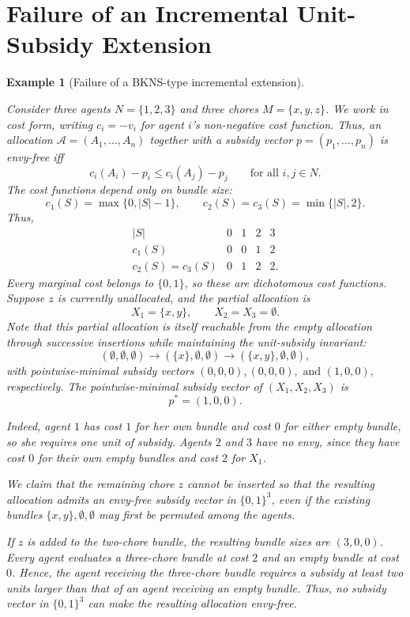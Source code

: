 \documentclass[11pt]{article}
\theoremstyle{plain}
\newtheorem{example}{Example}
\theoremstyle{plain}
\begin{document}
\section{Failure of an Incremental Unit-Subsidy Extension}
\label{sec:whynotbkns}


\begin{example}[Failure of a BKNS-type incremental extension]
\label{app:extension-failure}

Consider three agents $N=\{1,2,3\}$ and three chores $M=\{x,y,z\}$. We work in cost form, writing
\( c_i=-v_i \)
for agent \(i\)'s non-negative cost function. Thus, an allocation \(\mathcal A=(A_1,\ldots,A_n)\) together with a subsidy vector \(p=(p_1,\ldots,p_n)\) is envy-free iff
\[ c_i(A_i)-p_i\le c_i(A_j)-p_j
\qquad\text{for all } i,j\in N.
\]
The cost functions depend only on bundle size: \[ c_1(S)=\max\{0,|S|-1\}, \qquad c_2(S)=c_3(S)=\min\{|S|,2\}. \] Thus, \[
\begin{array}{c|cccc}
|S| & 0 & 1 & 2 & 3\\
\hline
c_1(S) & 0 & 0 & 1 & 2\\
c_2(S)=c_3(S) & 0 & 1 & 2 & 2 .
\end{array}
\] Every marginal cost belongs to $\{0,1\}$, so these are dichotomous cost functions. Suppose  $z$ is currently unallocated, and the partial allocation is \[
X_1=\{x,y\},
\qquad
X_2=X_3=\emptyset.
\] Note that this partial allocation is itself reachable from the empty allocation through successive insertions while maintaining the unit-subsidy invariant:
\[
(\emptyset,\emptyset,\emptyset)
\longrightarrow
(\{x\},\emptyset,\emptyset)
\longrightarrow
(\{x,y\},\emptyset,\emptyset),
\] with pointwise-minimal subsidy vectors
\(
(0,0,0), (0,0,0),\text{ and } (1,0,0),
\) respectively. The pointwise-minimal subsidy vector of $(X_1,X_2,X_3)$ is \[
p^*=(1,0,0).
\]

Indeed, agent $1$ has cost $1$ for her own bundle and cost $0$ for either empty bundle, so she requires one unit of subsidy. Agents $2$ and $3$ have no envy, since they have cost $0$ for their own empty bundles and cost $2$ for $X_1$.

We claim that the remaining chore $z$ cannot be inserted so that the resulting allocation admits an envy-free subsidy vector in $\{0,1\}^3$, even if the existing bundles $\{x,y\},\emptyset,\emptyset$ may first be permuted among the agents.

If $z$ is added to the two-chore bundle, the resulting bundle sizes are $(3,0,0)$. Every agent evaluates a three-chore bundle at cost $2$ and an empty bundle at cost $0$. Hence, the agent receiving the three-chore bundle requires a subsidy at least two units larger than that of an agent receiving an empty bundle. Thus, no subsidy vector in $\{0,1\}^3$ can make the resulting allocation envy-free.


\end{example}
\end{document}
